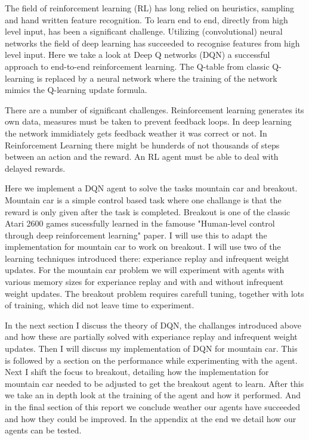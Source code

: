 The field of reinforcement learning (RL) has long relied on heuristics, sampling and hand written feature recognition. To learn end to end, directly from high level input, has been a significant challenge. Utilizing (convolutional) neural networks the field of deep learning has succeeded to recognise features from high level input. Here we take a look at Deep Q networks (DQN) a successful approach to end-to-end reinforcement learning. The Q-table from classic Q-learning is replaced by a neural network where the training of the network mimics the Q-learning update formula.

There are a number of significant challenges. Reinforcement learning generates its own data, measures must be taken to prevent feedback loops. In deep learning the network immidiately gets feedback weather it was correct or not. In Reinforcement Learning there might be hunderds of not thousands of steps between an action and the reward. An RL agent must be able to deal with delayed rewards. 

Here we implement a DQN agent to solve the tasks mountain car and breakout. Mountain car is a simple control based task where one challange is that the reward is only given after the task is completed. Breakout is one of the classic Atari 2600 games sucessfully learned in the famouse "Human-level control through deep reinforcement learning"\cite{DQN} paper. I will use this to adapt the implementation for mountain car to work on breakout. I will use two of the learning techniques introduced there: experiance replay and infrequent weight updates. For the mountain car problem we will experiment with agents with various memory sizes for experiance replay and with and without infrequent weight updates. The breakout problem requires carefull tuning, together with lots of training, which did not leave time to experiment.

In the next section I discuss the theory of DQN, the challanges introduced above and how these are partially solved with experiance replay and infrequent weight updates. Then I will discuss my implementation of DQN for mountain car. This is followed by a section on the performance while experimenting with the agent. Next I shift the focus to breakout, detailing how the implementation for mountain car needed to be adjusted to get the breakout agent to learn. After this we take an in depth look at the training of the agent and how it performed. And in the final section of this report we conclude weather our agents have succeeded and how they could be improved. In the appendix at the end we detail how our agents can be tested.